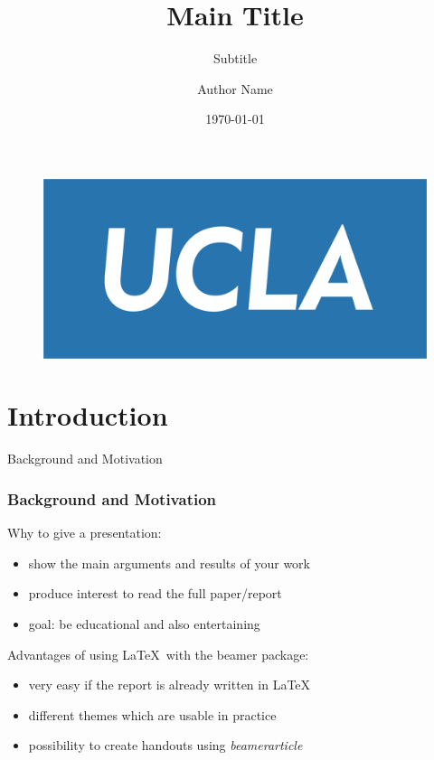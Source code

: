 \documentclass[serif, aspectratio=169]{beamer}
\author{Author Name}
\title{Main Title}
\subtitle{Subtitle}
\institute{
   University of California, Los Angeles \\
   Course or Conference
}
\date{\small \today}
\begin{document}
\begin{frame}
    \titlepage
    \vspace*{-0.6cm}
    \begin{figure}[htpb]
        \begin{center}
            \includegraphics[keepaspectratio, scale=0.1]{pic/ucla-logo.png}
        \end{center}
    \end{figure}
\end{frame}

\begin{frame}    
\tableofcontents[sectionstyle=show,
subsectionstyle=show/shaded/hide,
subsubsectionstyle=show/shaded/hide]
\end{frame}


\section{Introduction}
\begin{frame}{Background and Motivation}
	\frametitle<presentation>{Background and Motivation}
	\begin{block}{Why to give a presentation:}
		\begin{itemize}
			\item show the main arguments and results of your work
			\item produce interest to read the full paper/report
			\item goal: be educational and also entertaining
		\end{itemize}
	\end{block}
	\begin{block}{Advantages of using \LaTeX ~with the beamer package:}
		\begin{itemize}
			\item very easy if the report is already written in \LaTeX
			\item different themes which are usable in practice
			\item possibility to create handouts using \emph{beamerarticle}
		\end{itemize}
	\end{block}
\end{frame}
\end{document}
